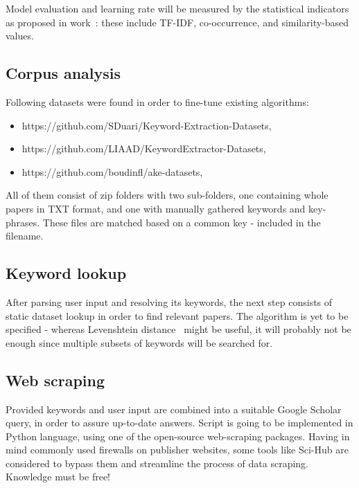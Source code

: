 \documentclass[fleqn,moreauthors,10pt]{ds_report}
\begin{document}
Model evaluation and learning rate will be measured by the statistical indicators as proposed in work~\cite{firoozeh2020keyword}: these include TF-IDF, co-occurrence, and similarity-based values.

\subsection*{Corpus analysis}

Following datasets were found in order to fine-tune existing algorithms:

\begin{itemize}
    \item https://github.com/SDuari/Keyword-Extraction-Datasets,
    \item https://github.com/LIAAD/KeywordExtractor-Datasets,
    \item https://github.com/boudinfl/ake-datasets,
\end{itemize}

All of them consist of zip folders with two sub-folders, one containing whole papers in TXT format, and one with manually gathered keywords and key-phrases. These files are matched based on a common key - included in the filename.

\subsection*{Keyword lookup}

After parsing user input and resolving its keywords, the next step consists of static dataset lookup in order to find relevant papers. The algorithm is yet to be specified - whereas Levenshtein distance~\cite{yujian2007normalized} might be useful, it will probably not be enough since multiple subsets of keywords will be searched for.

\subsection*{Web scraping}

Provided keywords and user input are combined into a suitable Google Scholar query, in order to assure up-to-date answers. Script is going to be implemented in Python language, using one of the open-source web-scraping packages.
\newline
Having in mind commonly used firewalls on publisher websites, some tools like Sci-Hub are considered to bypass them and streamline the process of data scraping. Knowledge must be free!
\end{document}
